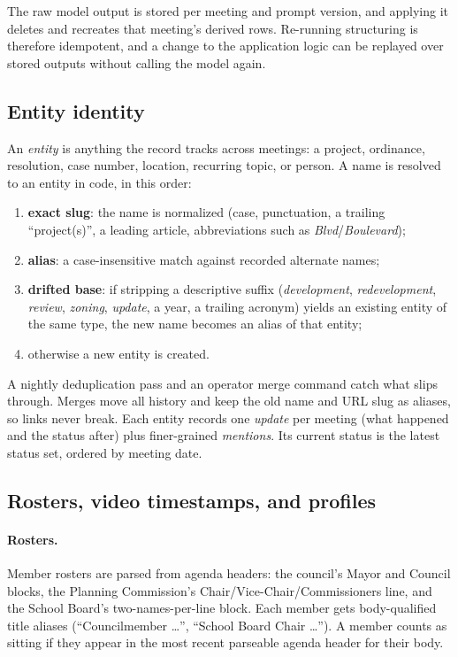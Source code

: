 \documentclass[11pt]{article}
\begin{document}
The raw model output is stored per meeting and prompt version, and applying it deletes
and recreates that meeting's derived rows. Re-running structuring is therefore
idempotent, and a change to the application logic can be replayed over stored outputs
without calling the model again.

\subsection{Entity identity}
\label{sec:entities}

An \emph{entity} is anything the record tracks across meetings: a project, ordinance,
resolution, case number, location, recurring topic, or person. A name is resolved to an
entity in code, in this order:
\begin{enumerate}
  \item \textbf{exact slug}: the name is normalized (case, punctuation, a trailing
        ``project(s)'', a leading article, abbreviations such as \emph{Blvd}/\emph{Boulevard});
  \item \textbf{alias}: a case-insensitive match against recorded alternate names;
  \item \textbf{drifted base}: if stripping a descriptive suffix (\emph{development},
        \emph{redevelopment}, \emph{review}, \emph{zoning}, \emph{update}, a year, a trailing
        acronym) yields an existing entity of the same type, the new name becomes an alias
        of that entity;
  \item otherwise a new entity is created.
\end{enumerate}
A nightly deduplication pass and an operator merge command catch what slips through.
Merges move all history and keep the old name and URL slug as aliases, so links never
break. Each entity records one \emph{update} per meeting (what happened and the status
after) plus finer-grained \emph{mentions}. Its current status is the latest status set,
ordered by meeting date.

\subsection{Rosters, video timestamps, and profiles}

\paragraph{Rosters.} Member rosters are parsed from agenda headers: the council's Mayor
and Council blocks, the Planning Commission's Chair/Vice-Chair/Commissioners line, and
the School Board's two-names-per-line block. Each member gets body-qualified title
aliases (``Councilmember \ldots'', ``School Board Chair \ldots''). A member counts as
sitting if they appear in the most recent parseable agenda header for their body.
\end{document}
